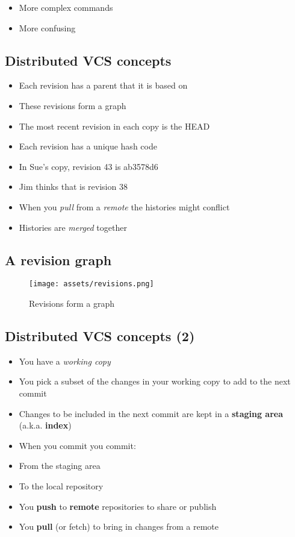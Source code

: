 \documentclass[]{scrartcl}
\makeatletter
\def\maxwidth{\ifdim\Gin@nat@width>\linewidth\linewidth
\else\Gin@nat@width\fi}
\let\Oldincludegraphics\includegraphics
\renewcommand{\includegraphics}[1]{\Oldincludegraphics[width=\maxwidth]{#1}}
\makeatother
\begin{document}
\begin{itemize}
\itemsep1pt\parskip0pt
\item
  More complex commands
\item
  More confusing
\end{itemize}

\subsection{Distributed VCS concepts}\label{distributed-vcs-concepts}

\begin{itemize}
\itemsep1pt\parskip0pt
\item
  Each revision has a parent that it is based on
\item
  These revisions form a graph
\item
  The most recent revision in each copy is the HEAD
\item
  Each revision has a unique hash code
\item
  In Sue's copy, revision 43 is ab3578d6
\item
  Jim thinks that is revision 38
\item
  When you \emph{pull} from a \emph{remote} the histories might conflict
\item
  Histories are \emph{merged} together
\end{itemize}

\subsection{A revision graph}\label{a-revision-graph}

\begin{figure}[htbp]
\centering
\texttt{[image: assets/revisions.png]}
\caption{Revisions form a graph}
\end{figure}

\subsection{Distributed VCS concepts
(2)}\label{distributed-vcs-concepts-2}

\begin{itemize}
\itemsep1pt\parskip0pt
\item
  You have a \emph{working copy}
\item
  You pick a subset of the changes in your working copy to add to the
  next commit
\item
  Changes to be included in the next commit are kept in a
  \textbf{staging area} (a.k.a. \textbf{index})
\item
  When you commit you commit:
\item
  From the staging area
\item
  To the local repository
\item
  You \textbf{push} to \textbf{remote} repositories to share or publish
\item
  You \textbf{pull} (or fetch) to bring in changes from a remote
\end{itemize}
\end{document}
